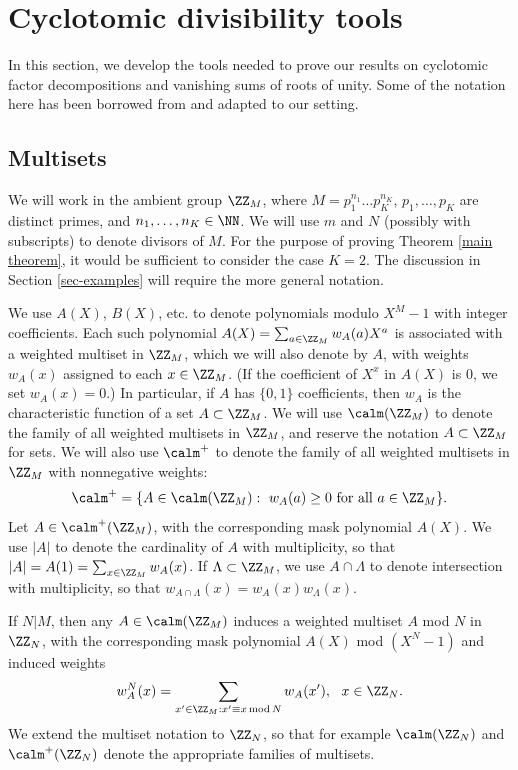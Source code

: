 \section{Cyclotomic divisibility tools}\label{cyclo-tools}

In this section, we develop the tools needed to prove our results on cyclotomic factor decompositions and vanishing sums of roots of unity. Some of the notation here has been borrowed from \cite{LaLo1} and adapted to our setting.

\subsection{Multisets}
 
We will work in the ambient group $\ZZ_M$, where $M=p_1^{n_1}\dots p_K^{n_K}$, $p_1,\dots,p_K$ are distinct primes, and $n_1,\dots,n_K\in\NN$. We will use $m$ and $N$ (possibly with subscripts) to denote divisors of $M$. For the purpose of proving Theorem \ref{main theorem}, it would be sufficient to consider the case $K=2$. The discussion in Section \ref{sec-examples} will require the more general notation. 

We use $A(X)$, $B(X)$, etc. to denote polynomials modulo $X^M-1$ with integer coefficients. 
Each such polynomial $A(X)=\sum_{a\in\ZZ_M} w_A(a) X^a$ is associated with a weighted multiset in $\ZZ_M$, which we will also denote by $A$, with weights $w_A(x)$ assigned to each $x\in\ZZ_M$. (If the coefficient of $X^x$ in $A(X)$ is 0, we set $w_A(x)=0$.) In particular, if $A$ has $\{0,1\}$ coefficients, then
$w_A$ is the characteristic function of a set $A\subset \ZZ_M$. We will use $\calm(\ZZ_M)$ to denote the 
family of all weighted multisets in $\ZZ_M$, and reserve the notation $A\subset \ZZ_M$ for sets.
We will also use $\calm^+$ to denote the family of all weighted multisets in $\ZZ_M$ with nonnegative weights:
$$
\calm^+=\{A\in\calm(\ZZ_M): \ w_A(a)\geq 0\hbox{ for all }a\in\ZZ_M\}.
$$
Let $A\in\calm^+(\ZZ_M)$, with the corresponding mask polynomial $A(X)$. We use $|A|$ to denote the cardinality of $A$ with multiplicity, so that $|A|=A(1)=\sum_{x\in\ZZ_M}w_A(x)$.
If $\Lambda\subset\ZZ_M$, we use $A\cap\Lambda$ to denote intersection with multiplicity, so that $w_{A\cap\Lambda}(x)=w_A(x)w_\Lambda(x)$.


If $N|M$, then any $A\in \calm(\ZZ_M)$ induces a weighted multiset $A$ mod $N$ in $\ZZ_N$, with the corresponding mask polynomial $A(X)$ mod $(X^N-1)$ and induced weights 
\begin{equation}\label{induced-weights}
w_A^N(x)= \sum_{x'\in\ZZ_M: x'\equiv x\,{\rm mod}\, N} w_A(x'),\ \ x\in\ZZ_N.
\end{equation}
We extend the multiset notation to $\ZZ_N$, so that for example $\calm(\ZZ_N)$ and $\calm^+(\ZZ_N)$ denote the appropriate families of multisets.

